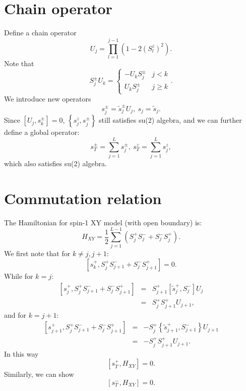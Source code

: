 \documentclass[aps,prb,superscriptaddress]{revtex4}
\begin{document}
\section{Chain operator }
Define a chain operator
\begin{equation}
U_{j}=\prod_{l=1}^{j-1}\left(1-2\left(S_{l}^{z}\right)^{2}\right).
\end{equation}
Note that
\begin{equation}
S_{j}^{\pm}U_{k}=\begin{cases}
-U_{k}S_{j}^{\pm} & j<k\\
U_{k}S_{j}^{\pm} & j\ge k
\end{cases}.
\end{equation}
We introduce new operators
\begin{equation}
s_{j}^{\pm}=\tilde{s}_{j}^{\pm}U_{j},\ s_{j}=\tilde{s}_{j}.
\end{equation}
Since $\left[U_{j},s_{k}^{\pm}\right]=0$, $\left\{ s_{j}^{z},s_{j}^{\pm}\right\} $
still satisfies su(2) algebra, and we can further define a global
operator:
\begin{equation}
s_{T}^{\pm}=\sum_{j=1}^{L}s_{j}^{\pm},\ s_{T}^{z}=\sum_{j=1}^{L}s_{j}^{z},
\end{equation}
which also satisfies su(2) algebra.



\section{Commutation relation}
The Hamiltonian for spin-1 XY model (with open boundary) is:
\begin{equation}
H_{XY}=\frac{1}{2}\sum_{j=1}^{L-1}\left(S_{j}^{+}S_{j}^{-}+S_{j}^{-}S_{j}^{+}\right).
\end{equation}
We first note that for $k\ne j,j+1$:
\begin{equation}
\left[s_{k}^{+},S_{j}^{+}S_{j+1}^{-}+S_{j}^{-}S_{j+1}^{+}\right]=0.
\end{equation}
While for $k=j$:
\begin{eqnarray}
\left[s_{j}^{+},S_{j}^{+}S_{j+1}^{-}+S_{j}^{-}S_{j+1}^{+}\right] & = & S_{j+1}^{+}\left[\tilde{s}_{j}^{+},S_{j}^{-}\right]U_{j}\\
 & = & S_{j}^{+}S_{j+1}^{+}U_{j+1},
\end{eqnarray}
and for $k=j+1$:
\begin{eqnarray}
\left[s_{j+1}^{+},S_{j}^{+}S_{j+1}^{-}+S_{j}^{-}S_{j+1}^{+}\right] & = & -S_{j}^{+}\left\{ \tilde{s}_{j+1}^{+},S_{j+1}^{-}\right\} U_{j+1}\\
 & = & -S_{j}^{+}S_{j+1}^{+}U_{j+1}.
\end{eqnarray}
In this way
\begin{equation}
\left[s_{T}^{+},H_{XY}\right]=0.
\end{equation}
Similarly, we can show
\begin{equation}
\left[s_{T}^{-},H_{XY}\right]=0.
\end{equation}


\end{document}
